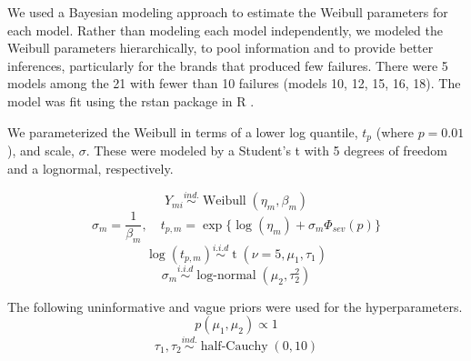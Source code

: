 \documentclass{article}
\begin{document}
We used a Bayesian modeling approach to estimate the Weibull parameters for each model. Rather than modeling each model independently, we modeled the Weibull parameters hierarchically, to pool information and to provide better inferences, particularly for the brands that produced few failures. There were 5 models among the 21 with fewer than 10 failures (models 10, 12, 15, 16, 18). The model was fit using the rstan package in R \cite{stan}.

We parameterized the Weibull in terms of a lower log quantile, $t_p$ (where $p=0.01$), and scale, $\sigma$. These were modeled by a Student's t with 5 degrees of freedom and a lognormal, respectively.

\[Y_{mi} \stackrel{ind.}{\sim} \operatorname{Weibull}(\eta_m, \beta_m)\]
\[\sigma_m = \frac{1}{\beta_m}, \quad t_{p,m} = \exp\{\log(\eta_m) + \sigma_m \Phi_{sev}(p)\}\]
\[\log(t_{p,m}) \stackrel{i.i.d}{\sim} \operatorname{t}(\nu = 5, \mu_1, \tau_1)\]
\[\sigma_m \stackrel{i.i.d}{\sim} \operatorname{log-normal}(\mu_2, \tau^2_2)\]

The following uninformative and vague priors were used for the hyperparameters.
\[p(\mu_1,\mu_2) \propto 1\]
\[\tau_1,\tau_2 \stackrel{ind.}{\sim} \operatorname{half-Cauchy}(0,10)\]


 
\end{document}
